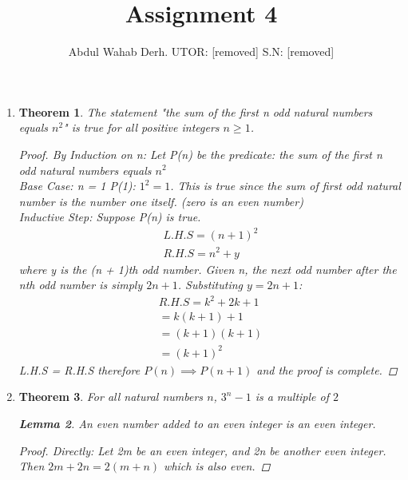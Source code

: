 \documentclass[11pt]{article}
\title{Assignment 4}
\author{Abdul Wahab Derh. UTOR: [removed] S.N: [removed]}
\begin{document}
\maketitle
\begin{enumerate}
\newtheorem{theorem}{Theorem}
\newtheorem{lemma}[theorem]{Lemma}
\item { %
\begin{theorem}The statement "the sum of the first n odd natural numbers equals $n^2$" is true for all positive integers $n \geq 1$.

\begin{proof}
By Induction on n:
Let P(n) be the predicate: the sum of the first n odd natural numbers equals $n^2$ \\

Base Case:
n = 1
P(1): $1^2 = 1$. This is true since the sum of first odd natural number is the number one itself. (zero is an even number)\\

Inductive Step: Suppose P(n) is true.
\begin{align*}
L.H.S = (n + 1)^2 \\
R.H.S = n^2 + y
\end{align*}
where y is the (n + 1)th odd number.
Given n, the next odd number after the nth odd number is simply $2n + 1$. Substituting $y = 2n + 1$:
\begin{align*}
R.H.S = k^2 + 2k + 1 \\
= k(k + 1) + 1 \\
= (k + 1)(k + 1) \\
= (k + 1)^2
\end{align*}
L.H.S = R.H.S therefore $P(n) \implies P(n + 1)$ and the proof is complete.

\end{proof}
\end{theorem}

}
\item{ %
\begin{theorem} For all natural numbers $n$, $3^n-1$ is a multiple of $2$

\begin{lemma} An even number added to an even integer is an even integer.

\begin{proof} Directly:
Let 2m be an even integer, and 2n be another even integer. Then $2m + 2n = 2(m + n)$ which is also even.
\end{proof}
\end{lemma}


\end{theorem}}
\end{enumerate}
\end{document}
